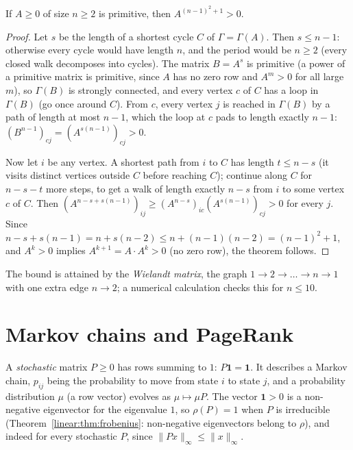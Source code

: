 \begin{theorem}[Wielandt]\label{linear:thm:wielandt}
If $A\ge0$ of size $n\ge2$ is primitive, then $A^{(n-1)^2+1}>0$.
\end{theorem}
\begin{proof}
Let $s$ be the length of a shortest cycle $C$ of $\Gamma=\Gamma(A)$. Then $s\le n-1$: otherwise every cycle would have length $n$,
and the period would be $n\ge2$ (every closed walk decomposes into cycles). The matrix $B=A^s$ is primitive (a power of a
primitive matrix is primitive, since $A$ has no zero row and $A^m>0$ for all large $m$), so $\Gamma(B)$ is strongly connected, and
every vertex $c$ of $C$ has a loop in $\Gamma(B)$ (go once around $C$). From $c$, every vertex $j$ is reached in $\Gamma(B)$ by a
path of length at most $n-1$, which the loop at $c$ pads to length exactly $n-1$: $(B^{n-1})_{cj}=(A^{s(n-1)})_{cj}>0$.

Now let $i$ be any vertex. A shortest path from $i$ to $C$ has length $t\le n-s$ (it visits distinct vertices outside $C$
before reaching $C$); continue along $C$ for $n-s-t$ more steps, to get a walk of length exactly $n-s$ from $i$ to some vertex
$c$ of $C$. Then $(A^{n-s+s(n-1)})_{ij}\ge(A^{n-s})_{ic}(A^{s(n-1)})_{cj}>0$ for every $j$. Since $n-s+s(n-1)=n+s(n-2)\le
n+(n-1)(n-2)=(n-1)^2+1$, and $A^{k}>0$ implies $A^{k+1}=A\cdot A^k>0$ (no zero row), the theorem follows.
\end{proof}

The bound is attained by the \emph{Wielandt matrix}, the graph $1\to2\to\dots\to n\to1$ with one extra edge $n\to2$; a numerical calculation
checks this for $n\le10$.

\section{Markov chains and PageRank}

A \emph{stochastic} matrix $P\ge0$ has rows summing to $1$: $P\mathbf 1=\mathbf 1$. It describes a Markov chain, $p_{ij}$ being the
probability to move from state $i$ to state $j$, and a probability distribution $\mu$ (a row vector) evolves as $\mu\mapsto\mu
P$. The vector $\mathbf 1>0$ is a non-negative eigenvector for the eigenvalue $1$, so $\rho(P)=1$ when $P$ is irreducible
(Theorem~\ref{linear:thm:frobenius}: non-negative eigenvectors belong to $\rho$), and indeed for every stochastic $P$, since $\|Px\|_\infty
\le\|x\|_\infty$.

